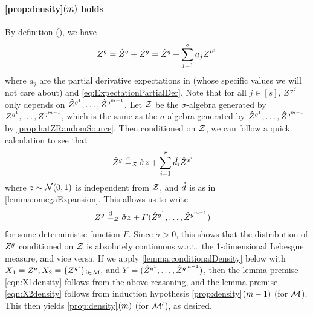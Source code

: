 \documentclass[main.tex]{subfiles}
\begin{document}
\paragraph{\ref{prop:density}$(m)$ holds}
By definition (), we have
\begin{align*}
Z^g = \hat Z^g + \dot Z^g = \hat Z^g + \sum_{j=1}^s a_j  Z^{v^j}
\end{align*}
where $a_j$ are the partial derivative expectations in  (whose specific values we will not care about) and \cref{eq:ExpectationPartialDer}.
Note that for all $j \in [s]$, $ Z^{v^j}$ only depends on $\hat Z^{g^1}, \ldots, \hat Z^{g^{m-1}}$.
Let $\mathcal{Z}$ be the $\sigma$-algebra generated by $Z^{g^1}, \ldots, Z^{g^{m-1}}$, which is the same as the $\sigma$-algebra generated by $\hat Z^{g^1}, \ldots, \hat Z^{g^{m-1}}$ by \cref{prop:hatZRandomSource}.
Then conditioned on $\mathcal{Z}$, we can follow a quick calculation to see that
\begin{align*}
\hat Z^{g}
  &\overset{\mathrm{d}}{=}_{\mathcal{Z}}
    \mathring \sigma z + \sum_{i=1}^r \mathring{d}_i \hat Z^{x^i}
\end{align*}
where $z \sim \mathcal{N}(0, 1)$ is independent from $\mathcal{Z}$, and $\mathring{d}$ is as in \cref{lemma:omegaExpansion}.
This allows us to write
\begin{align*}
Z^g
  &\overset{\mathrm{d}}{=}_{\mathcal{Z}}
    \mathring \sigma z + F(\hat Z^{g^1}, \ldots, \hat Z^{g^{m-1}})
\end{align*}
for some deterministic function $F$.
Since $\mathring \sigma > 0$, this shows that the distribution of $Z^g$ conditioned on $\mathcal{Z}$ is absolutely continuous w.r.t.\ the 1-dimensional Lebesgue measure, and vice versa.
If we apply \cref{lemma:conditionalDensity} below with $X_1 = Z^g, X_2 = \{Z^{g^i}\}_{i \in \mathcal{M}},$ and $Y = (\hat Z^{g^1}, \ldots, \hat Z^{g^{m-1}})$, then the lemma premise \cref{eqn:X1density} follows from the above reasoning, and the lemma premise \cref{eqn:X2density} follows from induction hypothesis \ref{prop:density}$(m-1)$ (for $\mathcal{M}$).
This then yields \ref{prop:density}$(m)$ (for $\mathcal{M}'$), as desired.
\end{document}
